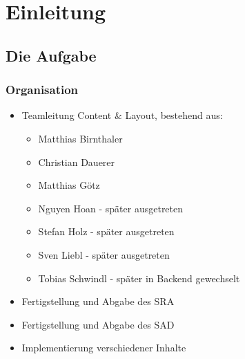 \section{Einleitung} %
\subsection{Die Aufgabe} %

\begin{frame} 
	\frametitle{Organisation}
	
	\begin{itemize}
		\item Teamleitung Content \& Layout, bestehend aus:
		\begin{itemize}
			\item Matthias Birnthaler
			\item Christian Dauerer
			\item Matthias Götz
			\item Nguyen Hoan - später ausgetreten
			\item Stefan Holz - später ausgetreten
			\item Sven Liebl - später ausgetreten
			\item Tobias Schwindl - später in Backend gewechselt
		\end{itemize}
		
		\item Fertigstellung und Abgabe des SRA
		\item Fertigstellung und Abgabe des SAD
		\item Implementierung verschiedener Inhalte
	\end{itemize}

\end{frame}
